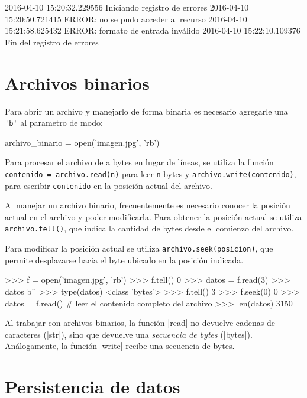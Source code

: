 \begin{codigo-nohl-sn}
2016-04-10 15:20:32.229556 Iniciando registro de errores
2016-04-10 15:20:50.721415 ERROR: no se pudo acceder al recurso
2016-04-10 15:21:58.625432 ERROR: formato de entrada inválido
2016-04-10 15:22:10.109376 Fin del registro de errores
\end{codigo-nohl-sn}

\section{Archivos binarios}

Para abrir un archivo y manejarlo de forma binaria es necesario agregarle
una \verb!'b'! al parametro de modo:

\begin{codigo-python-sn}
archivo_binario = open('imagen.jpg', 'rb')
\end{codigo-python-sn}

Para procesar el archivo de a bytes en lugar de líneas, se utiliza la
función \lstinline!contenido = archivo.read(n)! para leer \lstinline!n!
bytes y \lstinline!archivo.write(contenido)!, para
escribir \lstinline!contenido! en la posición actual del archivo.

Al manejar un archivo binario, frecuentemente es necesario conocer la
posición actual en el archivo y poder modificarla. Para obtener la
posición actual se utiliza \lstinline!archivo.tell()!, que
indica la cantidad de bytes desde el comienzo del archivo.

Para modificar la posición actual se utiliza
\lstinline!archivo.seek(posicion)!, que permite desplazarse hacia el byte
ubicado en la posición indicada.

\begin{codigo-python-sn}
>>> f = open('imagen.jpg', 'rb')
>>> f.tell()
0
>>> datos = f.read(3)
>>> datos
b'\xff{}\xff'
>>> type(datos)
<class 'bytes'>
>>> f.tell()
3
>>> f.seek(0)
0
>>> datos = f.read() # leer el contenido completo del archivo
>>> len(datos)
3150
\end{codigo-python-sn}

\begin{atencion}
Al trabajar con archivos binarios, la función |read| no devuelve cadenas de
caracteres (|str|), sino que devuelve una \emph{secuencia de bytes} (|bytes|).
Análogamente, la función |write| recibe una secuencia de bytes.
\end{atencion}

\section{Persistencia de datos}

